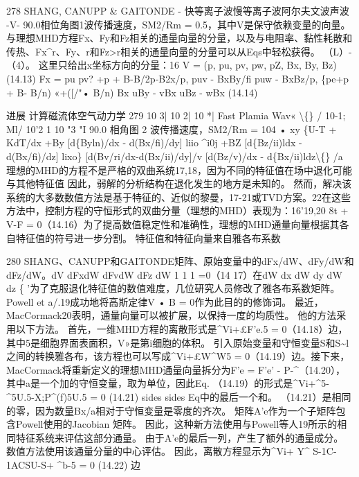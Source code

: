 \documentclass[UTF8,11pt,a4paper,openany,fontset=fandol]{ctexbook}
\begin{document}
278 SHANG, CANUPP \& GAITONDE - 快等离子波慢等离子波阿尔夫文波声波 -V- 90.0相位角图1波传播速度，SM2/Rm = 0.5，其中V是保守依赖变量的向量。 与理想MHD方程Fx、Fy和Fz相关的通量向量的分量，以及与电阻率、黏性耗散和传热、Fx\textasciicircum{}r、Fy、r和Fz>r相关的通量向量的分量可以从Eqs中轻松获得。 （L）-（4）。 这里只给出x坐标方向的分量：16 V = (p, pu, pv, pw, pZ, Bx, By, Bz) (14.13) Fx = pu pv? +p + B-B/2p-B2x/p, puv - BxBy/fi puw - BxBz/p, \{pe+p + B- B/n) «+([/"• B/n) Bx uBy - vBx uBz - wBx (14.14)

进展 计算磁流体空气动力学 279 10 3| 10 2| 10 *| Fast Plamia Wav« \textbackslash\{\} / 10-1; Ml/ 10'2 1 10 "3 "I 90.0 相角图 2 波传播速度，SM2/Rm = 104 • xy \{U-T + KdT/dx +By [d\{Byln)/dx - d(Bx/fi)/dy] liio \textasciicircum{}i0j +BZ [d\{Bz/ii)ldx - d(Bx/fi)/dz] lixo\} [d(Bv/ri/dx-d(Bx/ii)/dy]/v [d(Bz/v)/dx - d\{Bx/ii)ldz\textbackslash\{\} /a 理想的MHD的方程不是严格的双曲系统17,18，因为不同的特征值在场中退化可能与其他特征值 因此，弱解的分析结构在退化发生的地方是未知的。 然而，解决该系统的大多数数值方法是基于特征的、近似的黎曼，17-21或TVD方案。22在这些方法中，控制方程的守恒形式的双曲分量（理想的MHD）表现为：16'19,20 8t + V-F = 0（14.16）为了提高数值稳定性和准确性，理想的MHD通量向量根据其各自特征值的符号进一步分割。 特征值和特征向量来自雅各布系数

280 SHANG、CANUPP和GAITONDE矩阵、原始变量中的dFx/dW、dFy/dW和dFz/dW。dV dFxdW dFvdW dFz dW 1 1 1 =0（14 17）在dW dx dW dy dW dz \{ '为了克服退化特征值的数值难度，几位研究人员修改了雅各布系数矩阵。 Powell et a/.19成功地将高斯定律V • B = 0作为此目的的修饰词。 最近，MacCormack20表明，通量向量可以被扩展，以保持一度的均质性。 他的方法采用以下方法。 首先，一维MHD方程的离散形式是\textasciicircum{}Vi+£F'e.5 = 0（14.18）边，其中5是细胞界面表面积，V»是第i细胞的体积。 引入原始变量和守恒变量S和S\textasciitilde{}l之间的转换雅各布，该方程也可以写成\textasciicircum{}Vi+£W\textasciicircum{}W5 = 0（14.19）边。接下来，MacCormack将重新定义的理想MHD通量向量拆分为F'e = F'e' - P-\textasciicircum{}（14.20），其中a是一个加的守恒变量，取为单位，因此Eq. （14.19）的形式是\textasciicircum{}Vi+\textasciicircum{}5-\textasciicircum{}5U.5-X;P\textasciicircum{}(f)5U.5 = 0 (14.21) sides sides Eq中的最后一个和。 （14.21）是相同的零，因为数量Bx/a相对于守恒变量是零度的齐次。 矩阵A'e作为一个子矩阵包含Powell使用的Jacobian 矩阵。 因此，这种新方法使用与Powell等人19所示的相同特征系统来评估这部分通量。 由于A'e的最后一列，产生了额外的通量成分。 数值方法使用该通量分量的中心评估。 因此，离散方程显示为\textasciicircum{}Vi+ Y\textasciicircum{} S-1C-1ACSU-S+ \textasciicircum{}b-5 = 0 (14.22) 边
\end{document}

